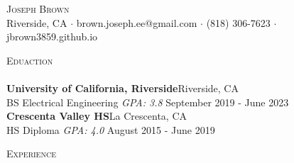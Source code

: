 \documentclass[a4paper]{article}
\newcommand{\lineunder} {
    \vspace*{-8pt} \\
    \hspace*{-18pt} \hrulefill \\
}
\newcommand{\header} [1] {
    {\hspace*{-18pt}\vspace*{6pt} \textsc{#1}}
    \vspace*{-6pt} \lineunder
}
\begin{document}
\vspace*{-40pt}

    

\vspace*{-10pt}
\begin{center}
	{\Huge \scshape {Joseph Brown}}\\
	Riverside, CA $\cdot$ brown.joseph.ee@gmail.com $\cdot$ (818) 306-7623 $\cdot$ jbrown3859.github.io\\
\end{center}

\header{Eduaction}
\textbf{University of California, Riverside}\hfill Riverside, CA\\
BS Electrical Engineering \textit{GPA: 3.8} \hfill September 2019 - June 2023\\
\vspace{2mm}
\textbf{Crescenta Valley HS}\hfill La Crescenta, CA\\
HS Diploma \textit{GPA: 4.0} \hfill August 2015 - June 2019\\
\vspace{2mm}

\header{Experience}
\vspace{1mm}
\end{document}
